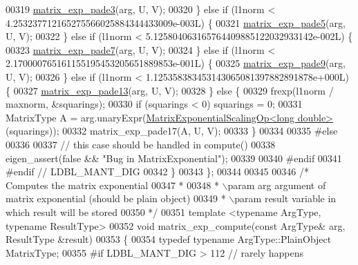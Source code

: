 \begin{DoxyCode}
00319       \hyperlink{namespace_eigen_1_1internal_a7e6cf2e01b6fb376d33b9bb8183e5777}{matrix\_exp\_pade3}(arg, U, V);
00320     \} \textcolor{keywordflow}{else} \textcolor{keywordflow}{if} (l1norm < 4.253237712165275566025884344433009e-003L) \{
00321       \hyperlink{namespace_eigen_1_1internal_af4992d182490219270a24aaa8285e63a}{matrix\_exp\_pade5}(arg, U, V);
00322     \} \textcolor{keywordflow}{else} \textcolor{keywordflow}{if} (l1norm < 5.125804063165764409885122032933142e-002L) \{
00323       \hyperlink{namespace_eigen_1_1internal_a1abecb439e6cb1b5188828cdb7e0ab60}{matrix\_exp\_pade7}(arg, U, V);
00324     \} \textcolor{keywordflow}{else} \textcolor{keywordflow}{if} (l1norm < 2.170000765161155195453205651889853e-001L) \{
00325       \hyperlink{namespace_eigen_1_1internal_a218447e97bf869bf354f92e020a7355a}{matrix\_exp\_pade9}(arg, U, V);
00326     \} \textcolor{keywordflow}{else} \textcolor{keywordflow}{if} (l1norm < 1.125358383453143065081397882891878e+000L) \{
00327       \hyperlink{namespace_eigen_1_1internal_ae7d0962a143c96343984440db683905a}{matrix\_exp\_pade13}(arg, U, V);
00328     \} \textcolor{keywordflow}{else} \{
00329       frexp(l1norm / maxnorm, &squarings);
00330       \textcolor{keywordflow}{if} (squarings < 0) squarings = 0;
00331       MatrixType A = arg.unaryExpr(\hyperlink{struct_eigen_1_1internal_1_1_matrix_exponential_scaling_op}{MatrixExponentialScalingOp<long double>}
      (squarings));
00332       matrix\_exp\_pade17(A, U, V);
00333     \}
00334   
00335 \textcolor{preprocessor}{#else}
00336   
00337     \textcolor{comment}{// this case should be handled in compute()}
00338     eigen\_assert(\textcolor{keyword}{false} && \textcolor{stringliteral}{"Bug in MatrixExponential"}); 
00339   
00340 \textcolor{preprocessor}{#endif}
00341 \textcolor{preprocessor}{#endif  // LDBL\_MANT\_DIG}
00342   \}
00343 \};
00344 
00345 
00346 \textcolor{comment}{/* Computes the matrix exponential}
00347 \textcolor{comment}{ *}
00348 \textcolor{comment}{ * \(\backslash\)param arg    argument of matrix exponential (should be plain object)}
00349 \textcolor{comment}{ * \(\backslash\)param result variable in which result will be stored}
00350 \textcolor{comment}{ */}
00351 \textcolor{keyword}{template} <\textcolor{keyword}{typename} ArgType, \textcolor{keyword}{typename} ResultType>
00352 \textcolor{keywordtype}{void} matrix\_exp\_compute(\textcolor{keyword}{const} ArgType& arg, ResultType &result)
00353 \{
00354   \textcolor{keyword}{typedef} \textcolor{keyword}{typename} ArgType::PlainObject MatrixType;
00355 \textcolor{preprocessor}{#if LDBL\_MANT\_DIG > 112 // rarely happens}

\end{DoxyCode}
